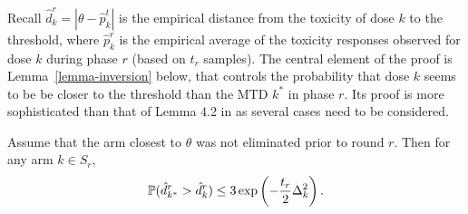 Recall $\hat{d}_k^r = |\theta - \hat{p}_k^t|$ is the empirical distance from the toxicity of dose $k$ to the threshold, where $\hat{p}_k^r$ is the empirical average of the toxicity responses observed for dose $k$ during phase $r$ (based on $t_r$ samples). The central element of the proof is Lemma~\ref{lemma-inversion} below, that controls the probability that dose $k$ seems to be be closer to the threshold than the MTD $k^*$ in phase $r$. Its proof is more sophisticated than that of Lemma 4.2 in \cite{Karnin13} as several cases need to be considered. 
%
%
\begin{lemma}
\label{lemma-inversion}
Assume that the arm closest to $\theta$ was not eliminated
prior to round $r$.
Then for any arm $k \in S_r$,
\begin{equation}\mathbb{P}(\hat{d}^r_{k^*} > \hat{d}^r_k) \leq 3 \exp\left(- \frac{t_r}{2}\Delta_k^2\right).\label{toproofin4case}\end{equation}
\end{lemma}
%
%
